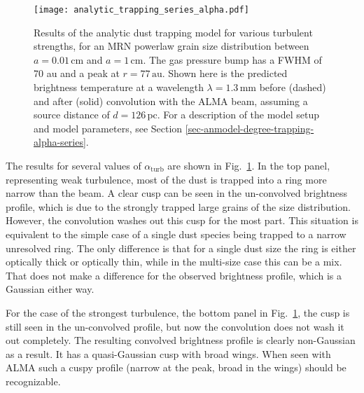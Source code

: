 \documentclass{aa}
\begin{document}
\begin{figure}
\centerline{\texttt{[image: analytic\_trapping\_series\_alpha.pdf]}}
\caption{\label{fig-anmodel-series-alpha}Results of the analytic dust trapping
  model for various turbulent strengths, for an MRN powerlaw grain size
  distribution between $a=0.01\,\mathrm{cm}$ and $a=1\,\mathrm{cm}$. The gas
  pressure bump has a FWHM of 70 au and a peak at $r=77\,\mathrm{au}$. Shown
  here is the predicted brightness temperature at a wavelength
  $\lambda=1.3\,\mathrm{mm}$ before (dashed) and after (solid) convolution with
  the ALMA beam, assuming a source distance of $d=126\,\mathrm{pc}$. For a
  description of the model setup and model parameters, see Section
  \ref{sec-anmodel-degree-trapping-alpha-series}.}
\end{figure}

The results for several values of $\alpha_{\mathrm{turb}}$ are shown in
Fig.~\ref{fig-anmodel-series-alpha}. In the top panel, representing weak
turbulence, most of the dust is trapped into a ring more narrow than the
beam. A clear cusp can be seen in the un-convolved brightness profile,
which is due to the strongly trapped large grains of the size distribution.
However, the convolution washes out this cusp for the most part. This
situation is equivalent to the simple case of a single dust species being
trapped to a narrow unresolved ring. The only difference is that for a single
dust size the ring is either optically thick or optically thin, while in the
multi-size case this can be a mix. That does not make a difference for the
observed brightness profile, which is a Gaussian either way.

For the case of the strongest turbulence, the bottom panel in
Fig.~\ref{fig-anmodel-series-alpha}, the cusp is still seen in the un-convolved
profile, but now the convolution does not wash it out completely. The resulting
convolved brightness profile is clearly non-Gaussian as a result. It has a
quasi-Gaussian cusp with broad wings. When seen with ALMA such a cuspy profile
(narrow at the peak, broad in the wings) should be recognizable.
\end{document}
